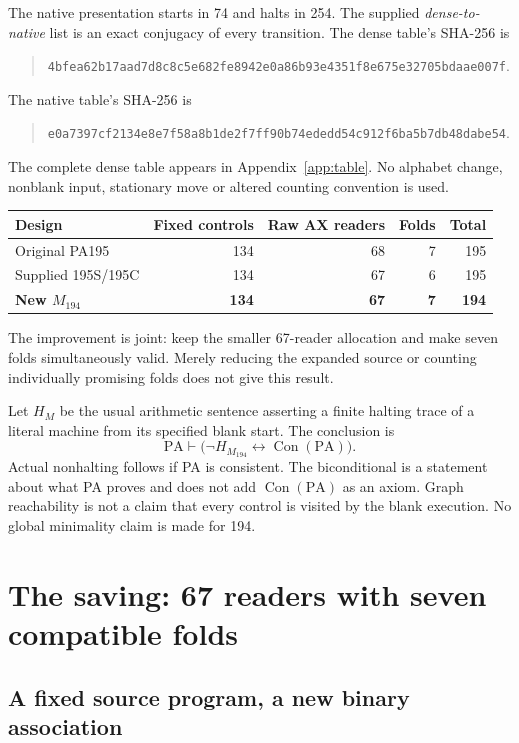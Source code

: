 \documentclass[11pt,letterpaper]{article}
\newcommand{\PA}{\mathrm{PA}}
\newcommand{\Con}{\operatorname{Con}}
\newcommand{\MX}{M_{194}}
\begin{document}
The native presentation starts in 74 and halts in 254. The supplied
\emph{dense-to-native} list is an exact conjugacy of every transition.
The dense table's SHA-256 is
\begin{quote}\small
\nolinkurl{4bfea62b17aad7d8c8c5e682fe8942e0a86b93e4351f8e675e32705bdaae007f}.
\end{quote}
The native table's SHA-256 is
\begin{quote}\small
\nolinkurl{e0a7397cf2134e8e7f58a8b1de2f7ff90b74ededd54c912f6ba5b7db48dabe54}.
\end{quote}
The complete dense table appears in Appendix~\ref{app:table}.
No alphabet change, nonblank input, stationary move or altered counting
convention is used.

\begin{center}
\begin{tabular}{@{}lrrrr@{}}
\toprule
Design & Fixed controls & Raw AX readers & Folds & Total\\
\midrule
Original PA195 &134&68&7&195\\
Supplied 195S/195C &134&67&6&195\\
\textbf{New $\MX$} &\textbf{134}&\textbf{67}&\textbf{7}&\textbf{194}\\
\bottomrule
\end{tabular}
\end{center}
The improvement is joint: keep the smaller 67-reader allocation and make
seven folds simultaneously valid. Merely reducing the expanded source or
counting individually promising folds does not give this result.

Let $H_M$ be the usual arithmetic sentence asserting a finite halting
trace of a literal machine from its specified blank start. The conclusion is
\[
 \boxed{\displaystyle
       \PA\vdash\bigl(\neg H_{\MX}\leftrightarrow\Con(\PA)\bigr).}
\]
Actual nonhalting follows if PA is consistent. The biconditional is a
statement about what PA proves and does not add $\Con(\PA)$ as an axiom.
Graph reachability is not a claim that every control is visited by the
blank execution. No global minimality claim is made for 194.



\section{The saving: 67 readers with seven compatible folds}
\label{sec:decoder}

\subsection{A fixed source program, a new binary association}
\end{document}
